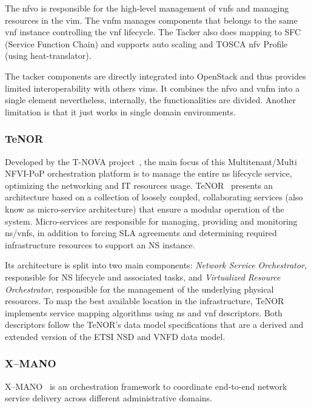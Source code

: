 The \gls{nfvo} is responsible for the high-level management of \glspl{vnf} and managing resources in the \gls{vim}. The \gls{vnfm} manages components that belongs to the same \gls{vnf} instance controlling the \gls{vnf} lifecycle. The Tacker also does mapping to SFC (Service Function Chain) and supports auto scaling and TOSCA \gls{nfv} Profile (using heat-translator).

The tacker components are directly integrated into OpenStack and thus provides limited interoperability with others \glspl{vim}. It combines the \gls{nfvo} and \gls{vnfm} into a single element nevertheless, internally, the functionalities are divided. Another limitation is that it just works in single domain environments.   

\subsubsection{TeNOR}
Developed by the T-NOVA project~\cite{FP7projectT-NOVAT-NOVAInfrastructures}, the main focus of this Multitenant/Multi NFVI-PoP orchestration platform is to manage the entire \gls{ns} lifecycle service, optimizing the networking and IT resources usage. TeNOR~\cite{7502419} presents an architecture based on a collection of loosely coupled, collaborating services (also know as micro-service architecture) that ensure a modular operation of the system. Micro-services are responsible for managing, providing and monitoring \gls{ns}/\glspl{vnf}, in addition to forcing SLA agreements and determining required infrastructure resources to support an NS instance. 

Its architecture is split into two main components: \textit{Network Service Orchestrator}, responsible for NS lifecycle and associated tasks, and \textit{Virtualized Resource Orchestrator}, responsible for the management of the underlying physical resources. To map the best available location in the infrastructure, TeNOR implements service mapping algorithms using \gls{ns} and \gls{vnf} descriptors. Both descriptors follow the TeNOR's data model specifications that are a derived and extended version of the ETSI NSD and VNFD data model.

\subsubsection{X--MANO}
X--MANO~\cite{francescon2017x} is an orchestration framework to coordinate end-to-end network service delivery across different administrative domains. 

